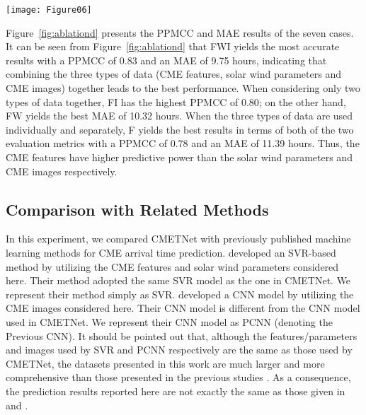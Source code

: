 \documentclass{article}
\begin{document}
\begin{figure*}[ht]
\begin{center}
\texttt{[image: Figure06]}
\end{center}
\caption{Results of the ablation tests for assessing seven cases
(FWI, FW, FI, WI, F, W, I)
where FWI represents the combination of CME features, solar wind parameters and CME images,
FW represents the combination of CME features and solar wind parameters,
FI represents the combination of CME features and CME images,
WI represents the combination of solar wind parameters and CME images,
F represents the CME features,
W represents the solar wind parameters, and 
I represents the CME images.
(a) Pearson product-moment correlation coefficients (PPMCCs) of the tested cases.
(b) Mean absolute errors (MAEs) of the tested cases.
FWI yields the best performance among all the tested cases.}
\label{fig:ablationd}
\end{figure*}

Figure~\ref{fig:ablationd} presents 
the PPMCC and MAE results of the seven cases.
It can be seen from Figure~\ref{fig:ablationd} that
FWI yields the most accurate results with a PPMCC of 0.83 and an MAE of 9.75 hours,
indicating that combining the three types of data (CME features, solar wind parameters and CME images) together
leads to the best performance.
When considering only two types of data together, 
FI has the highest PPMCC of 0.80; 
on the other hand, FW yields the best MAE of 10.32 hours. 
When the three types of data are used individually and separately, 
F yields the best results in terms of both of the two evaluation metrics 
with a PPMCC of 0.78 and an MAE of 11.39 hours. 
Thus, the CME features have higher predictive power than
the solar wind parameters and CME images respectively.

\subsection{Comparison with Related Methods}
In  this  experiment, we compared CMETNet with 
previously published machine learning methods 
for CME arrival time prediction.
\citet{2018ApJ...855..109L} developed an SVR-based method
by utilizing the CME features and solar wind parameters
considered here.
Their method adopted the same SVR model as the one in CMETNet.
We represent their method simply as SVR.
\citet{2019ApJ...881...15W} developed a CNN model 
by utilizing the CME images considered here.
Their CNN model is 
different from the CNN model used in CMETNet.
We represent their CNN model as PCNN (denoting the Previous CNN).
It should be pointed out that, 
although the features/parameters and images 
used by SVR and PCNN respectively are the same as those used 
by CMETNet,
the datasets presented in this work are much larger and more comprehensive than
those presented in the previous studies
\citep{2018ApJ...855..109L,2019ApJ...881...15W}.
As a consequence, the prediction results reported here are not exactly the same
as those given in \citet{2018ApJ...855..109L} and \citet{2019ApJ...881...15W}.
\end{document}
